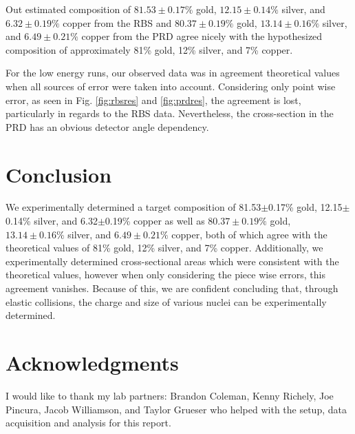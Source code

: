 \documentclass[10pt]{IEEEtran}
\begin{document}
Out estimated composition of $81.53\pm0.17\%$ gold, $12.15\pm0.14\%$ silver, and $6.32\pm0.19\%$ copper from the RBS and $80.37\pm0.19\%$ gold, $13.14\pm0.16\%$ silver, and $6.49\pm0.21\%$ copper from the PRD agree nicely with the hypothesized composition of approximately 81\% gold, 12\% silver, and 7\% copper.

For the low energy runs, our observed data was in agreement theoretical values when all sources of error were taken into account. Considering only point wise error, as seen in Fig. \ref{fig:rbsres} and \ref{fig:prdres}, the agreement is lost, particularly in regards to the RBS data. Nevertheless, the cross-section in the PRD has an obvious detector angle dependency.
\section{Conclusion}

We experimentally determined a target composition of 81.53$\pm$0.17\% gold, 12.15$\pm$0.14\% silver, and 6.32$\pm$0.19\% copper as well as $80.37\pm0.19\%$ gold, $13.14\pm0.16\%$ silver, and $6.49\pm0.21\%$ copper, both of which agree with the theoretical values of 81\% gold, 12\% silver, and 7\% copper. Additionally, we experimentally determined cross-sectional areas which were consistent with the theoretical values, however when only considering the piece wise errors, this agreement vanishes. Because of this, we are confident concluding that, through elastic collisions, the charge and size of various nuclei can be experimentally determined.

\section{Acknowledgments}
I would like to thank my lab partners: Brandon Coleman, Kenny Richely, Joe Pincura, Jacob Williamson, and Taylor Grueser who helped with the setup, data acquisition and analysis for this report.
\printbibliography
\end{document}
